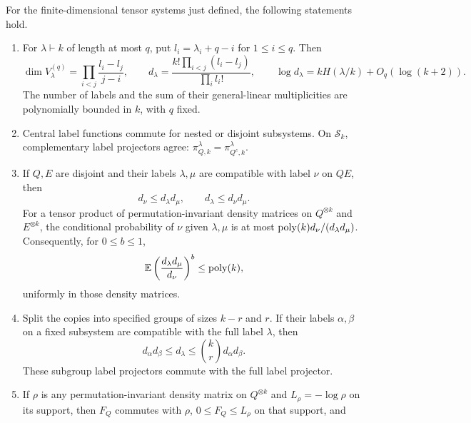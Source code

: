 \begin{lemma}\label{lem:schur}
For the finite-dimensional tensor systems just defined, the following
statements hold.
\begin{enumerate}
\item For $\lambda\vdash k$ of length at most $q$, put
$l_i=\lambda_i+q-i$ for $1\le i\le q$.  Then
\begin{equation}\label{replicas:dimensions}
 \dim V^{(q)}_\lambda
   =\prod_{i<j}\frac{l_i-l_j}{j-i},\qquad
 d_\lambda=\frac{k!\prod_{i<j}(l_i-l_j)}{\prod_i l_i!},\qquad
 \log d_\lambda=kH(\lambda/k)+O_q(\log(k+2)).
\end{equation}
The number of labels and the sum of their general-linear multiplicities
are polynomially bounded in $k$, with $q$ fixed.
\item Central label functions commute for nested or disjoint
subsystems.  On $\mathcal S_k$, complementary label projectors agree:
$\pi_{Q,k}^{\lambda}=\pi_{Q^c,k}^{\lambda}$.
\item If $Q,E$ are disjoint and their labels $\lambda,\mu$ are
compatible with label $\nu$ on $QE$, then
\begin{equation}\label{replicas:merge-dimensions}
 d_\nu\le d_\lambda d_\mu,\qquad
 d_\lambda\le d_\nu d_\mu.
\end{equation}
For a tensor product of permutation-invariant density matrices on
$Q^{\otimes k}$ and $E^{\otimes k}$, the conditional probability of
$\nu$ given $\lambda,\mu$ is at most
$\operatorname{poly}(k)d_\nu/(d_\lambda d_\mu)$.  Consequently, for $0\le b\le1$,
\begin{equation}\label{replicas:merge-moment}
 \mathbb E\left(\frac{d_\lambda d_\mu}{d_\nu}\right)^b
 \le\operatorname{poly}(k),
\end{equation}
uniformly in those density matrices.
\item Split the copies into specified groups of sizes $k-r$ and $r$.
If their labels $\alpha,\beta$ on a fixed subsystem are compatible with
the full label $\lambda$, then
\begin{equation}\label{replicas:group-dimensions}
 d_\alpha d_\beta\le d_\lambda
       \le \binom{k}{r}d_\alpha d_\beta.
\end{equation}
These subgroup label projectors commute with the full label projector.
\item If $\rho$ is any permutation-invariant density matrix on
$Q^{\otimes k}$ and $L_\rho=-\log\rho$ on its support, then $F_Q$
commutes with $\rho$, $0\le F_Q\le L_\rho$ on that support, and
\begin{equation}\label{replicas:surprisal-moment}

\end{equation}
\end{enumerate}
\end{lemma}
